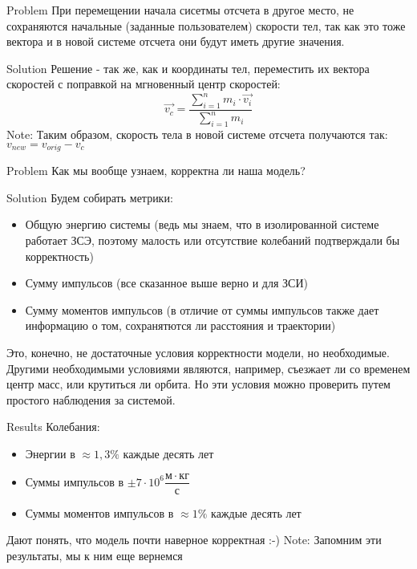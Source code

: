 \documentclass{beamer}
\begin{document}
\begin{frame}[fragile]{Problem}
  При перемещении начала сисетмы отсчета в другое место, не сохраняются начальные (заданные пользователем) скорости тел,
  так как это тоже вектора и в новой системе отсчета они будут иметь другие значения.
\end{frame}

\begin{frame}[fragile]{Solution}
  Решение - так же, как и координаты тел, переместить их вектора скоростей с поправкой на мгновенный центр скоростей:
  \[\overrightarrow{v_c} = \dfrac{\sum_{i = 1}^{n} m_i \cdot \overrightarrow{v_i}}{\sum_{i = 1}^{n} m_i}\]
  Note: Таким образом, скорость тела в новой системе отсчета получаются так: $v_{new} = v_{orig} - v_c$
\end{frame}

\begin{frame}[fragile]{Problem}
  Как мы вообще узнаем, корректна ли наша модель?
\end{frame}

\begin{frame}[fragile]{Solution}
  Будем собирать метрики:
  \begin{itemize}
    \item<2-> Общую энергию системы (ведь мы знаем, что в изолированной системе работает ЗСЭ, поэтому
    малость или отсутствие колебаний подтверждали бы корректность)
    \item<3-> Сумму импульсов (все сказанное выше верно и для ЗСИ)
    \item<4-> Сумму моментов импульсов (в отличие от суммы импульсов также дает информацию о том,
    сохранятются ли расстояния и траектории)
  \end{itemize}
  \pause[5]
  Это, конечно, не достаточные условия корректности модели, но необходимые.
  Другими необходимыми условиями являются, например, съезжает ли со временем центр масс, или
  крутиться ли орбита. Но эти условия можно проверить путем простого наблюдения за системой. 
\end{frame}

\begin{frame}[fragile]{Results}
  Колебания:
  \begin{itemize}
    \item<1-> Энергии в $\approx 1,3\%$ каждые десять лет
    \item<2-> Суммы импульсов в $\pm 7 \cdot {10}^6 \dfrac{м \cdot кг}{с}$
    \item<3-> Суммы моментов импульсов в $\approx 1\%$ каждые десять лет
  \end{itemize}
  \pause[4]
  Дают понять, что модель почти наверное корректная :-)\newline
  Note: Запомним эти результаты, мы к ним еще вернемся
\end{frame}
\end{document}
